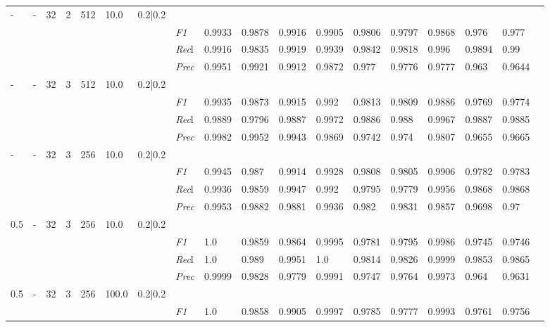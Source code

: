 \begin{table}[]
\begin{tabularx}{\textwidth}{XXXXXXX|X|XXX|XXX|XXXX}
- & - & 32 & 2 & 512 &10.0 & 0.2|0.2 & & & & & & & & & \\
& & & & & & & \textit{F1} & 0.9933 & 0.9878 & 0.9916 & 0.9905 & 0.9806        & 0.9797        & 0.9868        & 0.976        & 0.977        \\
& & & & & & & \textit{Rec}l & 0.9916 & 0.9835 & 0.9919    & 0.9939 & 0.9842    & 0.9818    & 0.996    & 0.9894    & 0.99    \\
& & & & & & & \textit{Prec} & 0.9951 & 0.9921 & 0.9912 & 0.9872 & 0.977 & 0.9776 & 0.9777 & 0.963 & 0.9644 \\ \midrule
- & - & 32 & 3 & 512 &10.0 & 0.2|0.2 & & & & & & & & & \\
& & & & & & & \textit{F1} & 0.9935 & 0.9873 & 0.9915 & 0.992 & 0.9813        & 0.9809        & 0.9886        & 0.9769        & 0.9774        \\
& & & & & & & \textit{Rec}l & 0.9889 & 0.9796 & 0.9887    & 0.9972 & 0.9886    & 0.988    & 0.9967    & 0.9887    & 0.9885    \\
& & & & & & & \textit{Prec} & 0.9982 & 0.9952 & 0.9943 & 0.9869 & 0.9742 & 0.974 & 0.9807 & 0.9655 & 0.9665 \\ \midrule
- & - & 32 & 3 & 256 &10.0 & 0.2|0.2 & & & & & & & & & \\
& & & & & & & \textit{F1} & 0.9945 & 0.987 & 0.9914 & 0.9928 & 0.9808        & 0.9805        & 0.9906        & 0.9782        & 0.9783        \\
& & & & & & & \textit{Rec}l & 0.9936 & 0.9859 & 0.9947    & 0.992 & 0.9795    & 0.9779    & 0.9956    & 0.9868    & 0.9868    \\
& & & & & & & \textit{Prec} & 0.9953 & 0.9882 & 0.9881 & 0.9936 & 0.982 & 0.9831 & 0.9857 & 0.9698 & 0.97 \\ \midrule
0.5 & - & 32 & 3 & 256 &10.0 & 0.2|0.2 & & & & & & & & & \\
& & & & & & & \textit{F1} & 1.0 & 0.9859 & 0.9864 & 0.9995 & 0.9781        & 0.9795        & 0.9986        & 0.9745        & 0.9746        \\
& & & & & & & \textit{Rec}l & 1.0 & 0.989 & 0.9951    & 1.0 & 0.9814    & 0.9826    & 0.9999    & 0.9853    & 0.9865    \\
& & & & & & & \textit{Prec} & 0.9999 & 0.9828 & 0.9779 & 0.9991 & 0.9747 & 0.9764 & 0.9973 & 0.964 & 0.9631 \\ \midrule
0.5 & - & 32 & 3 & 256 &100.0 & 0.2|0.2 & & & & & & & & & \\
& & & & & & & \textit{F1} & 1.0 & 0.9858 & 0.9905 & 0.9997 & 0.9785        & 0.9777        & 0.9993        & 0.9761        & 0.9756        \\

\end{tabularx}
\end{table}
